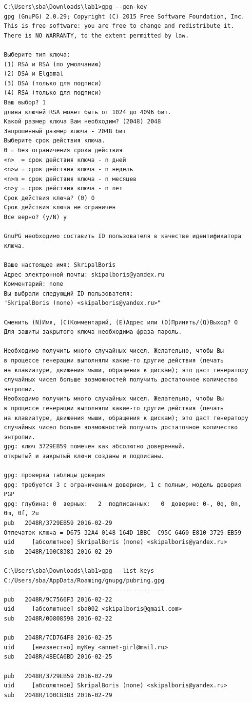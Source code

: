 \documentclass[10pt,a4paper]{report}
\begin{document}
\begin{verbatim}
C:\Users\sba\Downloads\lab1>gpg --gen-key
gpg (GnuPG) 2.0.29; Copyright (C) 2015 Free Software Foundation, Inc.
This is free software: you are free to change and redistribute it.
There is NO WARRANTY, to the extent permitted by law.

Выберите тип ключа:
(1) RSA и RSA (по умолчанию)
(2) DSA и Elgamal
(3) DSA (только для подписи)
(4) RSA (только для подписи)
Ваш выбор? 1
длина ключей RSA может быть от 1024 до 4096 бит.
Какой размер ключа Вам необходим? (2048) 2048
Запрошенный размер ключа - 2048 бит
Выберите срок действия ключа.
0 = без ограничения срока действия
<n>  = срок действия ключа - n дней
<n>w = срок действия ключа - n недель
<n>m = срок действия ключа - n месяцев
<n>y = срок действия ключа - n лет
Срок действия ключа? (0) 0
Срок действия ключа не ограничен
Все верно? (y/N) y

GnuPG необходимо составить ID пользователя в качестве идентификатора ключа.

Ваше настоящее имя: SkripalBoris
Адрес электронной почты: skipalboris@yandex.ru
Комментарий: none
Вы выбрали следующий ID пользователя:
"SkripalBoris (none) <skipalboris@yandex.ru>"

Сменить (N)Имя, (C)Комментарий, (E)Адрес или (O)Принять/(Q)Выход? O
Для защиты закрытого ключа необходима фраза-пароль.

Необходимо получить много случайных чисел. Желательно, чтобы Вы
в процессе генерации выполняли какие-то другие действия (печать
на клавиатуре, движения мыши, обращения к дискам); это даст генератору
случайных чисел больше возможностей получить достаточное количество энтропии.
Необходимо получить много случайных чисел. Желательно, чтобы Вы
в процессе генерации выполняли какие-то другие действия (печать
на клавиатуре, движения мыши, обращения к дискам); это даст генератору
случайных чисел больше возможностей получить достаточное количество энтропии.
gpg: ключ 3729EB59 помечен как абсолютно доверенный.
открытый и закрытый ключи созданы и подписаны.

gpg: проверка таблицы доверия
gpg: требуется 3 с ограниченным доверием, 1 с полным, модель доверия PGP
gpg: глубина: 0  верных:   2  подписанных:   0  доверие: 0-, 0q, 0n, 0m, 0f, 2u
pub   2048R/3729EB59 2016-02-29
Отпечаток ключа = D675 32A4 0148 164D 1BBC  C95C 6460 E810 3729 EB59
uid     [абсолютное] SkripalBoris (none) <skipalboris@yandex.ru>
sub   2048R/100C8383 2016-02-29

C:\Users\sba\Downloads\lab1>gpg --list-keys
C:/Users/sba/AppData/Roaming/gnupg/pubring.gpg
----------------------------------------------
pub   2048R/9C7566F3 2016-02-22
uid     [абсолютное] sba002 <skipalboris@gmail.com>
sub   2048R/00808598 2016-02-22

pub   2048R/7CD764F8 2016-02-25
uid     [неизвестно] myKey <annet-girl@mail.ru>
sub   2048R/4BECA6BD 2016-02-25

pub   2048R/3729EB59 2016-02-29
uid     [абсолютное] SkripalBoris (none) <skipalboris@yandex.ru>
sub   2048R/100C8383 2016-02-29
\end{verbatim}
\end{document}
